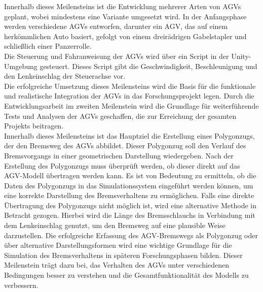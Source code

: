 Innerhalb dieses Meilensteins ist die Entwicklung mehrerer Arten von AGVs geplant, wobei mindestens eine Variante umgesetzt wird. In der Anfangsphase werden verschiedene AGVs entworfen, darunter ein AGV, das auf einem herkömmlichen Auto basiert, gefolgt von einem dreirädrigen Gabelstapler und schließlich einer Panzerrolle.\\
Die Steuerung und Fahranweisung der AGVs wird über ein Script in der Unity-Umgebung gesteuert. Dieses Script gibt die Geschwindigkeit, Beschleunigung und den Lenkeinschlag der Steuerachse vor.\\

Die erfolgreiche Umsetzung dieses Meilensteins wird die Basis für die funktionale und realistische Integration der AGVs in das Forschungsprojekt legen. Durch die Entwicklungsarbeit im zweiten Meilenstein wird die Grundlage für weiterführende Tests und Analysen der AGVs geschaffen, die zur Erreichung der gesamten Projekts beitragen.\\

Innerhalb dieses Meilensteins ist das Hauptziel die Erstellung eines Polygonzugs, der den Bremsweg des AGVs abbildet. Dieser Polygonzug soll den Verlauf des Bremsvorgangs in einer geometrischen Darstellung wiedergeben.\newline
Nach der Erstellung des Polygonzugs muss überprüft 
werden, ob dieser direkt auf das AGV-Modell übertragen werden kann. Es ist von Bedeutung zu ermitteln, ob die Daten des Polygonzugs in das Simulationssystem eingeführt werden können, um eine korrekte Darstellung des Bremsverhaltens zu ermöglichen.\newline
Falls eine direkte Übertragung des Polygonzugs nicht möglich ist, wird eine alternative Methode in Betracht gezogen. Hierbei wird die Länge des Bremsschlauchs in Verbindung mit dem Lenkeinschlag genutzt, um den Bremsweg auf eine plausible Weise darzustellen.\newline
Die erfolgreiche Erfassung des AGV-Bremswegs als Polygonzug oder über alternative Darstellungsformen wird eine wichtige Grundlage für die Simulation des Bremsverhaltens in späteren Forschungsphasen bilden. Dieser Meilenstein trägt dazu bei, das Verhalten des AGVs unter verschiedenen Bedingungen besser zu verstehen und die Gesamtfunktionalität des Modells zu verbessern.\\

